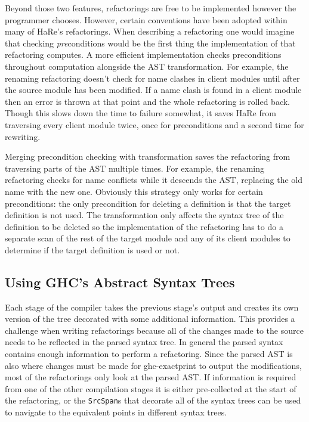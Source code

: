 Beyond those two features, refactorings are free to be implemented however the programmer chooses. However, certain conventions have been adopted within many of HaRe's refactorings. When describing a refactoring one would imagine that checking \textit{pre}conditions would be the first thing the implementation of that refactoring computes. A more efficient implementation checks preconditions throughout computation alongside the AST transformation. For example, the renaming refactoring doesn't check for name clashes in client modules until after the source module has been modified. If a name clash is found in a client module then an error is thrown at that point and the whole refactoring is rolled back. Though this slows down the time to failure somewhat, it saves HaRe from traversing every client module twice, once for preconditions and a second time for rewriting.

Merging precondition checking with transformation saves the refactoring from traversing parts of the AST multiple times. For example, the renaming refactoring checks for name conflicts while it descends the AST, replacing the old name with the new one. Obviously this strategy only works for certain preconditions: the only precondition for deleting a definition is that the target definition is not used. The transformation only affects the syntax tree of the definition to be deleted so the implementation of the refactoring has to do a separate scan of the rest of the target module and any of its client modules to determine if the target definition is used or not.

\subsection{Using GHC's Abstract Syntax Trees}
Each stage of the compiler takes the previous stage's output and creates its own version of the tree decorated with some additional information. This provides a challenge when writing refactorings because all of the changes made to the source needs to be reflected in the parsed syntax tree. In general the parsed syntax contains enough information to perform a refactoring. Since the parsed AST is also where changes must be made for ghc-exactprint to output the modifications, most of the refactorings only look at the parsed AST. If information is required from one of the other compilation stages it is either pre-collected at the start of the refactoring, or the \texttt{SrcSpan}s that decorate all of the syntax trees can be used to navigate to the equivalent points in different syntax trees.

